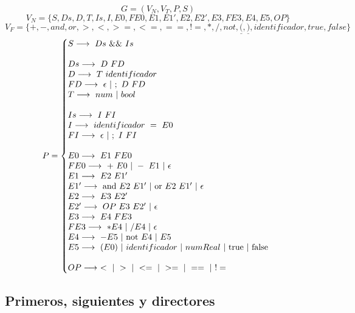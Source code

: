 $$G = (V_N, V_T, P, S)$$
$$V_N = \{S, Ds, D, T, Is, I, E0, FE0, E1, E1', E2, E2', E3, FE3, E4, E5, OP\}$$
$$V_F = \{+, -, and, or, >, <, >=, <=, ==, !=, *, /, not, \underline{(}, \underline{)}, identificador, true, false\}$$
\begin{equation*}P =\left\{
\begin{array}{@{}ll@{}}
S \longrightarrow\ Ds\ \&\&\ Is\\
\\
Ds \longrightarrow\ D\ FD\\
D \longrightarrow\ T\ identificador\\
FD \longrightarrow\ \epsilon\ |\ ;\ D\ FD\\
T \longrightarrow\ num\ |\ bool\\
\\
Is \longrightarrow\ I\ FI\\
I \longrightarrow\ identificador\ =\ E0\\
FI \longrightarrow\ \epsilon\ |\ ;\ I\ FI\\
\\
E0 \longrightarrow\ E1\ FE0\\
FE0 \longrightarrow\ +\ E0\ |\ -\ E1\ |\ \epsilon\\
E1 \longrightarrow\ E2\ E1'\\
E1' \longrightarrow\ \text{and}\ E2\ E1'\ |\ \text{or}\ E2\ E1'\ |\ \epsilon \\
E2 \longrightarrow\ E3\ E2'\\
E2' \longrightarrow\ OP\ E3\ E2'\ |\ \epsilon \\
E3 \longrightarrow\ E4 \ FE3\\
FE3 \longrightarrow\ *E4 \ |\ /E4 \ | \ \epsilon\\
E4 \longrightarrow\ -E5\ |\ \text{not}\ E4\ |\ E5\\
E5 \longrightarrow\ (E0)\ |\ identificador\ |\ numReal\ |\ \text{true}\ |\ \text{false}\\
\\
OP \longrightarrow\ <\ |\ >\ |\ <=\ |\ >=\ |\ ==\ |\ != \\
\end{array}
\right .
\end{equation*}

\newpage
\subsection{Primeros, siguientes y directores}

